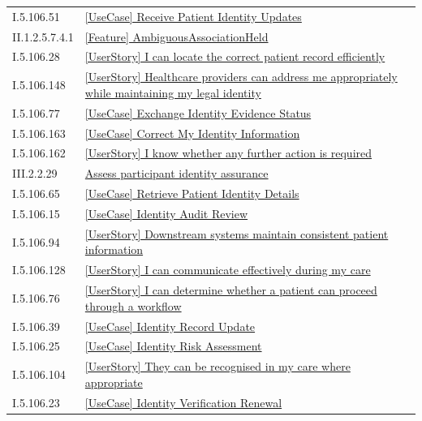 \begin{longtable}{p{.22\linewidth}p{.73\linewidth}}
I.5.106.51 & \hyperref[element:15f6ef4899d24ad7aef33e443e62d6c2]{[UseCase] Receive Patient Identity Updates} \\
II.1.2.5.7.4.1 & \hyperref[element:1617a2dde5f641dfb7c410bb6c946591]{[Feature] AmbiguousAssociationHeld} \\
I.5.106.28 & \hyperref[element:16877ddd41d9435ba6b87b039c1082e2]{[UserStory] I can locate the correct patient record efficiently} \\
I.5.106.148 & \hyperref[element:1b225b0e860647689850e610c806b5c0]{[UserStory] Healthcare providers can address me appropriately while maintaining my legal identity} \\
I.5.106.77 & \hyperref[element:1db214c7c01d4c0dbaa2358ef63cc5a5]{[UseCase] Exchange Identity Evidence Status} \\
I.5.106.163 & \hyperref[element:1ee3ad73bb8048b9a8320546bcc3d0d7]{[UseCase] Correct My Identity Information} \\
I.5.106.162 & \hyperref[element:21351129797c467dbacd34e7278d259d]{[UserStory] I know whether any further action is required} \\
III.2.2.29 & \hyperref[element:215676da8a3040bba2fa02574a4c3443]{Assess participant identity assurance} \\
I.5.106.65 & \hyperref[element:21dfb122d491412a95f71de52119b657]{[UseCase] Retrieve Patient Identity Details} \\
I.5.106.15 & \hyperref[element:238b0a03b40b42e98701e8d815e8474d]{[UseCase] Identity Audit Review} \\
I.5.106.94 & \hyperref[element:24c784ddaadc4ddaaa8f86878facf79d]{[UserStory] Downstream systems maintain consistent patient information} \\
I.5.106.128 & \hyperref[element:25d03e2a205a4937964a8b34efe3fe26]{[UserStory] I can communicate effectively during my care} \\
I.5.106.76 & \hyperref[element:274cd62f920d4ff693102a0df8c2c950]{[UserStory] I can determine whether a patient can proceed through a workflow} \\
I.5.106.39 & \hyperref[element:282541861dec49c8ad501c8f43c48764]{[UseCase] Identity Record Update} \\
I.5.106.25 & \hyperref[element:29ed8bc9509742f4be49e07fed848510]{[UseCase] Identity Risk Assessment} \\
I.5.106.104 & \hyperref[element:2a64f4a5492a4525ab64e8c551fd7af6]{[UserStory] They can be recognised in my care where appropriate} \\
I.5.106.23 & \hyperref[element:2bc4828c4c2046378998ed364002f04b]{[UseCase] Identity Verification Renewal} \\

\end{longtable}
